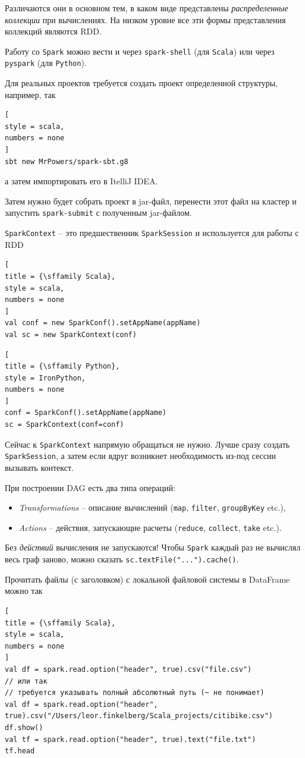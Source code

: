 \documentclass[%
	11pt,
	a4paper,
	utf8,
		]{article}
\begin{document}
Различаются они в основном тем, в каком виде представлены \emph{распределенные коллекции} при вычислениях. На низком уровне все эти формы представления коллекций являются RDD.

Работу со \texttt{Spark} можно вести и через \texttt{spark-shell} (для \texttt{Scala}) или через \texttt{pyspark} (для \texttt{Python}).

Для реальных проектов требуется создать проект определенной структуры, например, так
\begin{lstlisting}[
style = scala,
numbers = none	
]
sbt new MrPowers/spark-sbt.g8
\end{lstlisting}
а затем импортировать его в ItelliJ IDEA.

Затем нужно будет собрать проект в jar-файл, перенести этот файл на кластер и запустить \texttt{spark-submit} с полученным jar-файлом.

\texttt{SparkContext} -- это предшественник \texttt{SparkSession} и используется для работы с RDD
\begin{lstlisting}[
title = {\sffamily Scala},
style = scala,
numbers = none
]
val conf = new SparkConf().setAppName(appName)
val sc = new SparkContext(conf)
\end{lstlisting}

\begin{lstlisting}[
title = {\sffamily Python},
style = IronPython,
numbers = none	
]
conf = SparkConf().setAppName(appName)
sc = SparkContext(conf=conf)
\end{lstlisting}

Сейчас к \texttt{SparkContext} напрямую обращаться не нужно. Лучше сразу создать \texttt{SparkSession}, а затем если вдруг возникнет необходимость из-под сессии вызывать контекст.

При построении DAG есть два типа операций:
\begin{itemize}
	\item \emph{Transformations} -- описание вычислений (\texttt{map}, \texttt{filter}, \texttt{groupByKey} etc.),
	
	\item \emph{Actions} -- действия, запускающие расчеты (\texttt{reduce}, \texttt{collect}, \texttt{take} etc.).
\end{itemize}

Без \emph{действий} вычисления не запускаются! Чтобы \texttt{Spark} каждый раз не вычислял весь граф заново, можно сказать \texttt{sc.textFile("...").cache()}.

Прочитать файлы (с заголовком) с локальной файловой системы в DataFrame можно так
\begin{lstlisting}[
title = {\sffamily Scala},
style = scala,
numbers = none	
]
val df = spark.read.option("header", true).csv("file.csv")
// или так
// требуется указывать полный абсолютный путь (~ не понимает)
val df = spark.read.option("header", true).csv("/Users/leor.finkelberg/Scala_projects/citibike.csv")
df.show()
val tf = spark.read.option("header", true).text("file.txt")
tf.head
\end{lstlisting}
\end{document}
